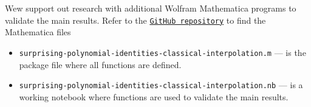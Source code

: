 Wew support out research with additional Wolfram Mathematica programs to validate
the main results.
Refer to the
\href{https://github.com/kolosovpetro/surprising-polynomial-identities-classical-interpolation}
{\texttt{GitHub repository}} to find the Mathematica files
\begin{itemize}
    \item \texttt{surprising-polynomial-identities-classical-interpolation.m} --- is the package file
    where all functions are defined.
    \item \texttt{surprising-polynomial-identities-classical-interpolation.nb} --- is a working notebook
    where functions are used to validate the main results.
\end{itemize}
